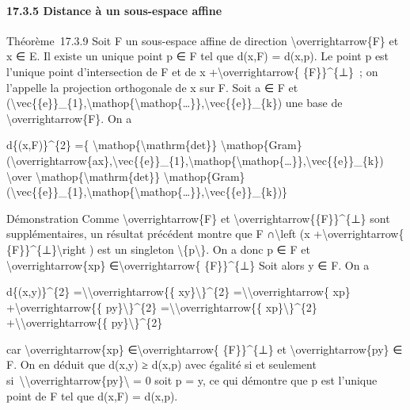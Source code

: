 \documentclass[]{article}
\begin{document}
\paragraph{17.3.5 Distance à un sous-espace affine}

Théorème~17.3.9 Soit F un sous-espace affine de direction
\textbackslash{}overrightarrow\{F\} et x ∈ E. Il existe un unique point
p ∈ F tel que d(x,F) = d(x,p). Le point p est l'unique point
d'intersection de F et de x +\textbackslash{}overrightarrow\{
\{F\}\}\^{}\{⊥\}~; on l'appelle la projection orthogonale de x sur F.
Soit a ∈ F et
(\textbackslash{}vec\{\{e\}\}\_\{1\},\textbackslash{}mathop\{\textbackslash{}mathop\{\ldots{}\}\},\textbackslash{}vec\{\{e\}\}\_\{k\})
une base de \textbackslash{}overrightarrow\{F\}. On a

d\{(x,F)\}\^{}\{2\} =\{
\textbackslash{}mathop\{\textbackslash{}mathrm\{det\}\}
\textbackslash{}mathop\{Gram\}(\textbackslash{}overrightarrow\{ax\},\textbackslash{}vec\{\{e\}\}\_\{1\},\textbackslash{}mathop\{\textbackslash{}mathop\{\ldots{}\}\},\textbackslash{}vec\{\{e\}\}\_\{k\})
\textbackslash{}over
\textbackslash{}mathop\{\textbackslash{}mathrm\{det\}\}
\textbackslash{}mathop\{Gram\}(\textbackslash{}vec\{\{e\}\}\_\{1\},\textbackslash{}mathop\{\textbackslash{}mathop\{\ldots{}\}\},\textbackslash{}vec\{\{e\}\}\_\{k\})\}

Démonstration Comme \textbackslash{}overrightarrow\{F\} et
\textbackslash{}overrightarrow\{\{F\}\}\^{}\{⊥\} sont supplémentaires,
un résultat précédent montre que F ∩\textbackslash{}left (x
+\textbackslash{}overrightarrow\{ \{F\}\}\^{}\{⊥\}\textbackslash{}right
) est un singleton \textbackslash{}\{p\textbackslash{}\}. On a donc p ∈
F et \textbackslash{}overrightarrow\{xp\}
∈\textbackslash{}overrightarrow\{ \{F\}\}\^{}\{⊥\} Soit alors y ∈ F. On
a

d\{(x,y)\}\^{}\{2\}
=\textbackslash{}\textbar{}\textbackslash{}overrightarrow\{\{
xy\}\textbackslash{}\textbar{}\}\^{}\{2\}
=\textbackslash{}\textbar{}\textbackslash{}overrightarrow\{ xp\}
+\textbackslash{}overrightarrow\{\{
py\}\textbackslash{}\textbar{}\}\^{}\{2\}
=\textbackslash{}\textbar{}\textbackslash{}overrightarrow\{\{
xp\}\textbackslash{}\textbar{}\}\^{}\{2\}
+\textbackslash{}\textbar{}\textbackslash{}overrightarrow\{\{
py\}\textbackslash{}\textbar{}\}\^{}\{2\}

car \textbackslash{}overrightarrow\{xp\}
∈\textbackslash{}overrightarrow\{ \{F\}\}\^{}\{⊥\} et
\textbackslash{}overrightarrow\{py\} ∈ F. On en déduit que d(x,y) ≥
d(x,p) avec égalité si et seulement
si~\textbackslash{}\textbar{}\textbackslash{}overrightarrow\{py\}\textbackslash{}\textbar{}
= 0 soit p = y, ce qui démontre que p est l'unique point de F tel que
d(x,F) = d(x,p).
\end{document}
